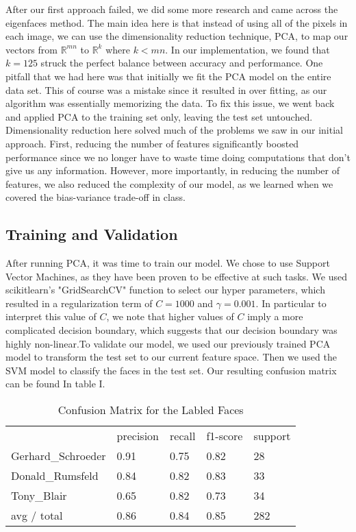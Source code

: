 \documentclass[letterpaper, 11pt, conference]{ieeeconf}
\begin{document}
After our first approach failed, we did some more research and came across the
eigenfaces method. The main idea here is that instead of using all of the pixels
in each image, we can use the dimensionality reduction technique, PCA, to map
our vectors from $\mathbb{R}^{mn}$ to $\mathbb{R}^{k}$ where $k < mn$. In our
implementation, we found that $k = 125$ struck the perfect balance between accuracy
and performance. One pitfall that we had here was that initially we fit the PCA model on the
entire data set. This of course was a mistake since it resulted in over fitting,
as our algorithm was essentially memorizing the data. To fix this issue, we went back
and applied PCA to the training set only, leaving the test set untouched.
Dimensionality reduction here solved much of the problems we saw in our initial
approach. First, reducing the number of features significantly boosted
performance since we no longer have to waste time doing computations that don't
give us any information. However, more importantly, in reducing the number of
features, we also reduced the complexity of our model, as we learned when
we covered the bias-variance trade-off in class.

\subsection{Training and Validation}
After running PCA, it was time to train our model. We chose to use Support
Vector Machines, as they have been proven to be effective at such tasks. We
used scikitlearn's "GridSearchCV" function to select our hyper parameters, which
resulted in a regularization term of $C = 1000$ and $\gamma = 0.001$. In
particular to interpret this value of $C$, we note that higher values of $C$
imply a more complicated decision boundary, which suggests that our decision
boundary was highly non-linear.To validate our model, we used our previously 
trained PCA model to transform the test set to our current feature space. 
Then we used the SVM model to classify the faces in the test set. 
Our resulting confusion matrix can be found In table I.

\begin{table}[h]
\caption{Confusion Matrix for the Labled Faces}
\begin{tabular}{lllll}
                   & precision & recall & f1-score & support \\
Gerhard\_Schroeder & 0.91      & 0.75   & 0.82     & 28      \\
Donald\_Rumsfeld   & 0.84      & 0.82   & 0.83     & 33      \\
Tony\_Blair        & 0.65      & 0.82   & 0.73     & 34      \\
avg / total        & 0.86      & 0.84   & 0.85     & 282    
\end{tabular}
\end{table}
\end{document}
